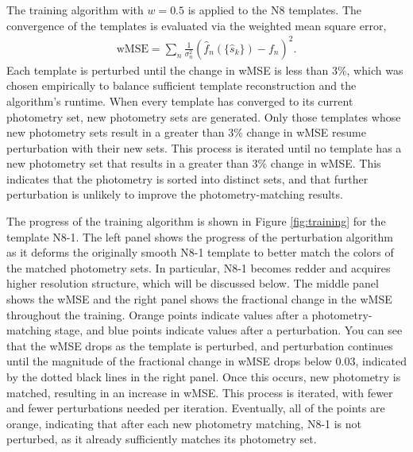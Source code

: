 The training algorithm with $w=0.5$ is applied to the N8 templates.
The convergence of the templates is evaluated via the weighted mean square error,
\begin{align}
    \text{wMSE} = \sum_n \frac{1}{\sigma_n^2}(\hat{f}_n(\{\hat{s}_k\}) - f_n)^2.
\end{align}
Each template is perturbed until the change in wMSE is less than 3\%, which was chosen empirically to balance sufficient template reconstruction and the algorithm's runtime.
When every template has converged to its current photometry set, new photometry sets are generated.
Only those templates whose new photometry sets result in a greater than 3\% change in wMSE resume perturbation with their new sets.
This process is iterated until no template has a new photometry set that results in a greater than 3\% change in wMSE.
This indicates that the photometry is sorted into distinct sets, and that further perturbation is unlikely to improve the photometry-matching results.

The progress of the training algorithm is shown in Figure \ref{fig:training} for the template N8-1.
The left panel shows the progress of the perturbation algorithm as it deforms the originally smooth N8-1 template to better match the colors of the matched photometry sets.
In particular, N8-1 becomes redder and acquires higher resolution structure, which will be discussed below.
The middle panel shows the wMSE and the right panel shows the fractional change in the wMSE throughout the training.
Orange points indicate values after a photometry-matching stage, and blue points indicate values after a perturbation.
You can see that the wMSE drops as the template is perturbed, and perturbation continues until the magnitude of the fractional change in wMSE drops below 0.03, indicated by the dotted black lines in the right panel.
Once this occurs, new photometry is matched, resulting in an increase in wMSE.
This process is iterated, with fewer and fewer perturbations needed per iteration.
Eventually, all of the points are orange, indicating that after each new photometry matching, N8-1 is not perturbed, as it already sufficiently matches its photometry set.

